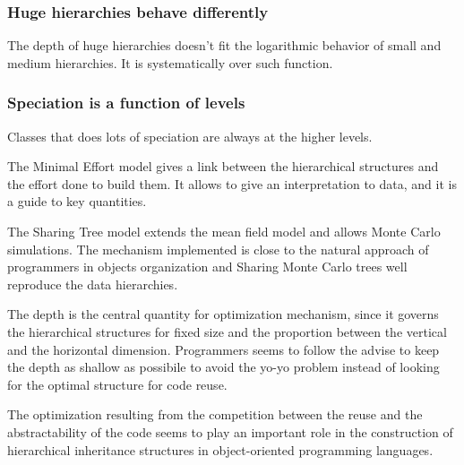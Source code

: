 \subsubsection{Huge hierarchies behave differently}
The depth of huge hierarchies doesn't fit the logarithmic behavior of small and medium hierarchies. It is systematically over such function.

\subsubsection{Speciation is a function of levels}
Classes that does lots of speciation are always at the higher levels.

\vspace{1cm}
The Minimal Effort model gives a link between the hierarchical structures and the effort done to build them. It allows to give an interpretation to data, and it is a guide to key quantities.

\vspace{0.5cm}
The Sharing Tree model extends the mean field model and allows Monte Carlo simulations. The mechanism implemented is close to the natural approach of programmers in objects organization and Sharing Monte Carlo trees well reproduce the data hierarchies.

\vspace{0.5cm}
The depth is the central quantity for optimization mechanism, since it governs the hierarchical structures for fixed size and the proportion between the vertical and the horizontal dimension. Programmers seems to follow the advise to keep the depth as shallow as possibile to avoid the yo-yo problem instead of looking for the optimal structure for code reuse.

\vspace{0.5cm}
The optimization resulting from the competition between the reuse and the abstractability of the code seems to play an important role in the construction of hierarchical inheritance structures in object-oriented programming languages.


